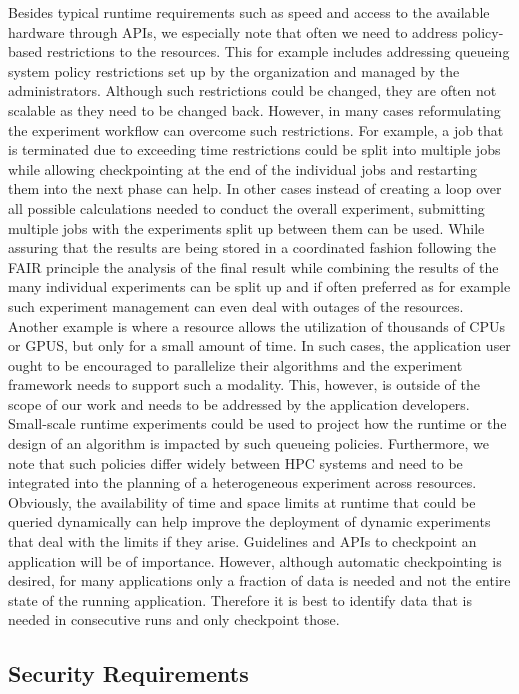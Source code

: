 \documentclass[utf8]{FrontiersinVancouver} %
\begin{document}
Besides typical runtime requirements such as speed and access to the available hardware through APIs, we especially note that often we need to address policy-based restrictions to the resources. This for example includes addressing queueing system policy restrictions set up by the organization and managed by the administrators. Although such restrictions could be changed, they are often not scalable as they need to be changed back. However, in many cases reformulating the experiment workflow can overcome such restrictions. For example, a job that is terminated due to exceeding time restrictions could be split into multiple jobs while allowing checkpointing at the end of the individual jobs and restarting them into the next phase can help. In other cases instead of creating a loop over all possible calculations needed to conduct the overall experiment, submitting multiple jobs with the experiments split up between them can be used. While assuring that the results are being stored in a coordinated fashion following the FAIR principle the analysis of the final result while combining the results of the many individual experiments can be split up and if often preferred as for example such experiment management can even deal with outages of the resources. Another example is where a resource allows the utilization of thousands of CPUs or GPUS, but only for a small amount of time. In such cases, the application user ought to be encouraged to parallelize their algorithms and the experiment framework needs to support such a modality. This, however, is outside of the scope of our work and needs to be addressed by the application developers. Small-scale runtime experiments could be used to project how the runtime or the design of an algorithm is impacted by such queueing policies.
Furthermore, we note that such policies differ widely between HPC systems and need to be integrated into the planning of a heterogeneous experiment across resources. Obviously, the availability of time and space limits at runtime that could be queried dynamically can help improve the deployment of dynamic experiments that deal with the limits if they arise. Guidelines and APIs to checkpoint an application will be of importance. However, although automatic checkpointing is desired, for many applications only a fraction of data is needed and not the entire state of the running application. Therefore it is best to identify data that is needed in consecutive runs and only checkpoint those.


\subsection{Security Requirements}
\end{document}
